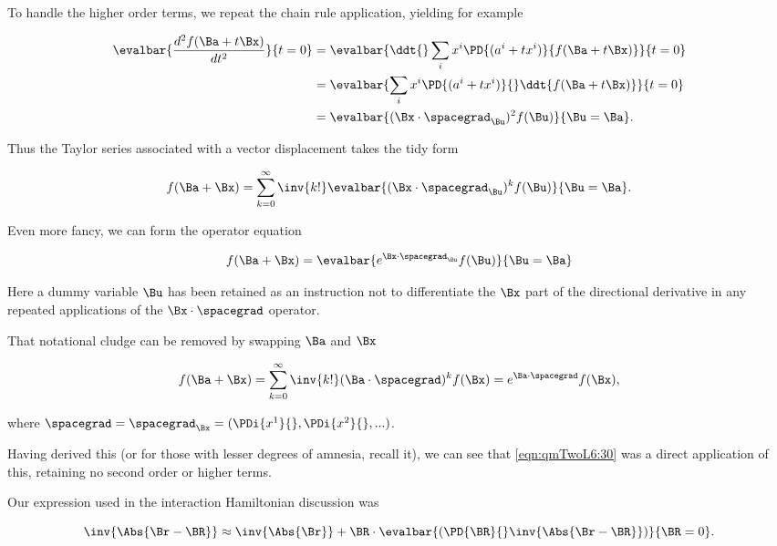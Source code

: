 To handle the higher order terms, we repeat the chain rule application, yielding for example

\begin{align*}
\evalbar{\frac{d^2 f(\Ba + t \Bx)}{dt^2} }{t=0} 
&=
\evalbar{\ddt{} 
\sum_i x^i 
\PD{(a^i + t x^i)}{f(\Ba + t \Bx)} }{t=0}\\
&=
\evalbar{\sum_i x^i 
\PD{(a^i + t x^i)}{} \ddt{f(\Ba + t \Bx)}}{t=0} \\
&=
\evalbar{(\Bx \cdot \spacegrad_{\Bu})^2 f(\Bu)}{\Bu = \Ba}.
\end{align*}

Thus the Taylor series associated with a vector displacement takes the tidy form

\begin{equation}\label{eqn:qmTwoL6:370}
f(\Ba + \Bx) = \sum_{k=0}^\infty \inv{k!} \evalbar{(\Bx \cdot \spacegrad_{\Bu})^k f(\Bu)}{\Bu = \Ba}.
\end{equation}

Even more fancy, we can form the operator equation

\begin{equation}\label{eqn:qmTwoL6:390}
f(\Ba + \Bx) = \evalbar{e^{ \Bx \cdot \spacegrad_{\Bu} } f(\Bu)}{\Bu = \Ba}
\end{equation}

Here a dummy variable $\Bu$ has been retained as an instruction not to differentiate the $\Bx$ part of the directional derivative in any repeated applications of the $\Bx \cdot \spacegrad$ operator.

That notational cludge can be removed by swapping $\Ba$ and $\Bx$

\begin{equation}\label{eqn:qmTwoL6:390b}
f(\Ba + \Bx) = 
\sum_{k=0}^\infty \inv{k!} (\Ba \cdot \spacegrad)^k f(\Bx)
=
e^{ \Ba \cdot \spacegrad } f(\Bx),
\end{equation}

where $\spacegrad = \spacegrad_{\Bx} = (\PDi{x^1}{}, \PDi{x^2}{}, ...)$.

Having derived this (or for those with lesser degrees of amnesia, recall it), we can see that \ref{eqn:qmTwoL6:30} was a direct application of this, retaining no second order or higher terms.

Our expression used in the interaction Hamiltonian discussion was

\begin{equation}\label{eqn:qmTwoL6:170}
\inv{\Abs{\Br - \BR}} \approx \inv{\Abs{\Br}} 
+ 
\BR \cdot \evalbar{\left(
\PD{\BR}{} \inv{\Abs{ \Br - \BR}}
\right)}{\BR = 0}.
\end{equation}

